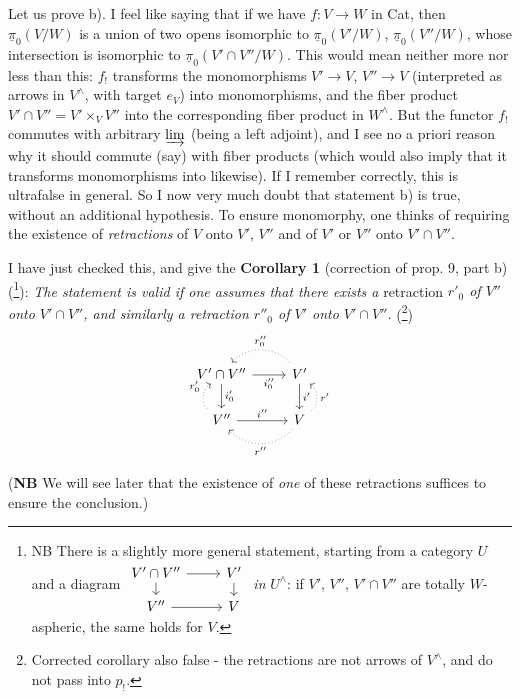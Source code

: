 \documentclass[11pt]{article}
\newcommand{\printedpage}[1]{\marginpar{\footnotesize p.~#1}}
\newcommand{\msp}[1]{\marginpar{\footnotesize [#1]}}
\newcommand{\upi}{\underline{\pi}}
\begin{document}
Let us prove b). I feel like saying that if we have $f : V \longrightarrow W$ in Cat, then $\upi_0(V/W)$ is a union of two opens isomorphic to $\upi_0(V'/W)$, $\upi_0(V''/W)$, whose intersection is isomorphic to $\upi_0(V'\cap V''/W)$. This would mean neither more nor
\msp{page 98}
less than this: $f_!$ transforms the monomorphisms $V' \longrightarrow V$, $V'' \longrightarrow V$ (interpreted as arrows in $V^\wedge$, with target $e_V$) into monomorphisms, and the fiber product $V'\cap V'' = V' \times_V V''$ into the corresponding fiber product in $W^\wedge$. But the functor $f_!$ commutes with arbitrary $\varinjlim$ (being a left adjoint), and I see no a priori reason why it should commute (say) with fiber products (which would also imply that it transforms monomorphisms into likewise). If I remember correctly, this is ultrafalse in general. So I now very much doubt that statement b) is true, without an additional hypothesis. To ensure monomorphy, one thinks of requiring the existence of \textit{retractions} of $V$ onto $V'$, $V''$ and of $V'$ or $V''$ onto $V'\cap V''$.

I have just checked this, and give the
\printedpage{69}
\textbf{Corollary 1} (correction of prop. 9, part b) (\footnote{NB There is a slightly more general statement, starting from a category $U$ and a diagram
$\begin{tikzcd}[ampersand replacement=\&, row sep=small]
V'\cap V'' \arrow[r] \arrow[d] \& V' \arrow[d] \\
V'' \arrow[r] \& V
\end{tikzcd}$
\textit{in} $U^\wedge$: if $V'$, $V''$, $V'\cap V''$ are totally $W$-aspheric, the same holds for $V$.}): \textit{The statement is valid if one assumes that there exists a} retraction \textit{$r'_0$ of $V''$ onto $V'\cap V''$, and similarly a retraction $r''_0$ of $V'$ onto $V'\cap V''$.} (\footnote{Corrected corollary also false - the retractions are not arrows of $V^\wedge$, and do not pass into $p_!$.}) %
\[
\begin{tikzcd}
V'\cap V'' \arrow[r, "i''_0"'] \arrow[d, "i'_0"] & V' \arrow[d, "i'"] \arrow[l, dotted, bend right=50, "r''_0"'] \\
V'' \arrow[r, "i''"] \arrow[u, dotted, bend left=50, "r'_0"] & V \arrow[u, dotted, bend right=50, "r'"'] \arrow[l, dotted, bend left=50, "r''"]
\end{tikzcd}
\]

(\textbf{NB} We will see later that the existence of \textit{one} of these retractions suffices to ensure the conclusion.)
\end{document}
